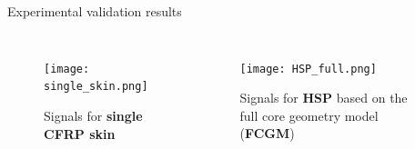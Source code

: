\documentclass[10pt]{beamer} %
\begin{document}
	\begin{frame}[label=frame13]{Experimental validation results}

		\begin{columns}[T]


			\begin{figure}

				\texttt{[image: single\_skin.png]}

				\caption{Signals for \textbf{single CFRP skin}}

				\label{fig:single_skin}

			\end{figure}


			\begin{figure}

				\texttt{[image: HSP\_full.png]}

				\caption{Signals for \textbf{HSP} based on the full core geometry model (\textbf{FCGM})}

				\label{fig:HSP_full}

			\end{figure}

		\end{columns}

	\end{frame}
\end{document}
